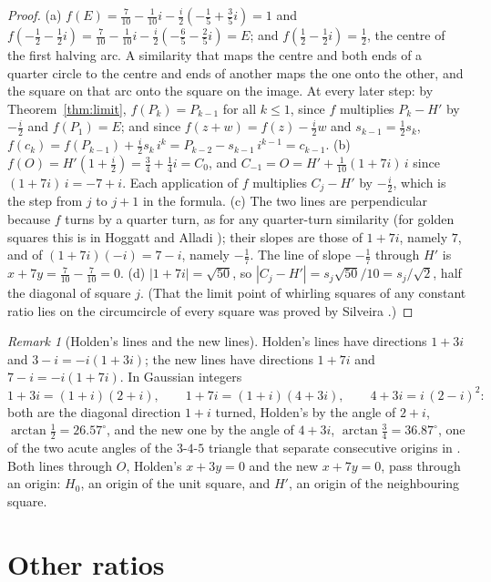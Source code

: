 \documentclass[11pt,a4paper]{article}
\theoremstyle{plain}
\theoremstyle{definition}
\theoremstyle{remark}
\newtheorem{remark}[theorem]{Remark}
\begin{document}
\begin{proof}
(a) $f(E)=\tfrac7{10}-\tfrac1{10}i-\tfrac i2(-\tfrac15+\tfrac35 i)=1$ and $f(-\tfrac12-\tfrac12i)=\tfrac7{10}-\tfrac1{10}i-\tfrac i2(-\tfrac65-\tfrac25 i)=E$; and $f(\tfrac12-\tfrac12i)=\tfrac12$, the centre of the first halving arc. A similarity that maps the centre and both ends of a quarter circle to the centre and ends of another maps the one onto the other, and the square on that arc onto the square on the image. At every later step: by Theorem~\ref{thm:limit}, $f(P_k)=P_{k-1}$ for all $k\le1$, since $f$ multiplies $P_k-H'$ by $-\tfrac i2$ and $f(P_1)=E$; and since $f(z+w)=f(z)-\tfrac i2 w$ and $s_{k-1}=\tfrac12 s_k$, $f(c_k)=f(P_{k-1})+\tfrac i2 s_k\,i^{k}=P_{k-2}-s_{k-1}\,i^{k-1}=c_{k-1}$. (b) $f(O)=H'(1+\tfrac i2)=\tfrac34+\tfrac14i=C_0$, and $C_{-1}=O=H'+\tfrac1{10}(1+7i)\,i$ since $(1+7i)\,i=-7+i$. Each application of $f$ multiplies $C_j-H'$ by $-\tfrac i2$, which is the step from $j$ to $j+1$ in the formula. (c) The two lines are perpendicular because $f$ turns by a quarter turn, as for any quarter-turn similarity (for golden squares this is in Hoggatt and Alladi \cite{hoggatt}); their slopes are those of $1+7i$, namely $7$, and of $(1+7i)(-i)=7-i$, namely $-\tfrac17$. The line of slope $-\tfrac17$ through $H'$ is $x+7y=\tfrac7{10}-\tfrac7{10}=0$. (d) $|1+7i|=\sqrt{50}$, so $|C_j-H'|=s_j\sqrt{50}/10=s_j/\sqrt2$, half the diagonal of square $j$. (That the limit point of whirling squares of any constant ratio lies on the circumcircle of every square was proved by Silveira \cite[Thm.~2.6]{silveira}.)
\end{proof}

\begin{remark}[Holden's lines and the new lines]\label{rem:gauss}
Holden's lines have directions $1+3i$ and $3-i=-i(1+3i)$; the new lines have directions $1+7i$ and $7-i=-i(1+7i)$. In Gaussian integers
\[
  1+3i=(1+i)(2+i),\qquad 1+7i=(1+i)(4+3i),\qquad 4+3i=i\,(2-i)^2 :
\]
both are the diagonal direction $1+i$ turned, Holden's by the angle of $2+i$, $\arctan\tfrac12=26.57^\circ$, and the new one by the angle of $4+3i$, $\arctan\tfrac34=36.87^\circ$, one of the two acute angles of the $3$-$4$-$5$ triangle that separate consecutive origins in \cite{origins}. Both lines through $O$, Holden's $x+3y=0$ and the new $x+7y=0$, pass through an origin: $H_0$, an origin of the unit square, and $H'$, an origin of the neighbouring square.
\end{remark}

\section{Other ratios}
\end{document}
